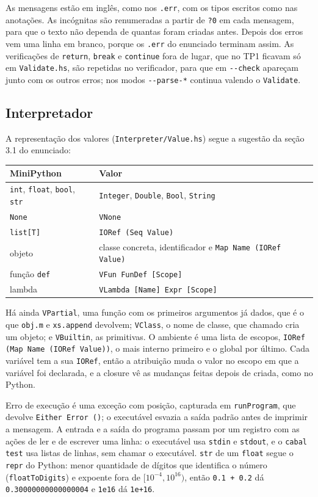 \documentclass[12pt,a4paper]{article}
\begin{document}
As mensagens estão em inglês, como nos \texttt{.err}, com os tipos
escritos como nas anotações. As incógnitas são renumeradas a partir de
\texttt{?0} em cada mensagem, para que o texto não dependa de quantas
foram criadas antes. Depois dos erros vem uma linha em branco, porque
os \texttt{.err} do enunciado terminam assim. As verificações de
\texttt{return}, \texttt{break} e \texttt{continue} fora de lugar, que
no TP1 ficavam só em \texttt{Validate.hs}, são repetidas no verificador,
para que em \texttt{-{}-check} apareçam junto com os outros erros; nos
modos \texttt{-{}-parse-*} continua valendo o \texttt{Validate}.

\subsection{Interpretador}

A representação dos valores (\texttt{Interpreter/Value.hs}) segue a
sugestão da seção 3.1 do enunciado:

\begin{center}
\begin{tabular}{ll}
\hline
MiniPython & Valor \\
\hline
\texttt{int}, \texttt{float}, \texttt{bool}, \texttt{str} & \texttt{Integer}, \texttt{Double}, \texttt{Bool}, \texttt{String} \\
\texttt{None} & \texttt{VNone} \\
\texttt{list[T]} & \texttt{IORef (Seq Value)} \\
objeto & classe concreta, identificador e \texttt{Map Name (IORef Value)} \\
função \texttt{def} & \texttt{VFun FunDef [Scope]} \\
lambda & \texttt{VLambda [Name] Expr [Scope]} \\
\hline
\end{tabular}
\end{center}

Há ainda \texttt{VPartial}, uma função com os primeiros argumentos já
dados, que é o que \texttt{obj.m} e \texttt{xs.append} devolvem;
\texttt{VClass}, o nome de classe, que chamado cria um objeto; e
\texttt{VBuiltin}, as primitivas. O ambiente é uma lista de escopos,
\texttt{IORef (Map Name (IORef Value))}, o mais interno primeiro e o
global por último. Cada variável tem a sua \texttt{IORef}, então a
atribuição muda o valor no escopo em que a variável foi declarada, e a
closure vê as mudanças feitas depois de criada, como no Python.

Erro de execução é uma exceção com posição, capturada em
\texttt{runProgram}, que devolve \texttt{Either Error ()}; o executável
esvazia a saída padrão antes de imprimir a mensagem. A entrada e a
saída do programa passam por um registro com as ações de ler e de
escrever uma linha: o executável usa \texttt{stdin} e \texttt{stdout},
e o \texttt{cabal test} usa listas de linhas, sem chamar o executável.
\texttt{str} de um \texttt{float} segue o \texttt{repr} do Python:
menor quantidade de dígitos que identifica o número
(\texttt{floatToDigits}) e expoente fora de $[10^{-4}, 10^{16})$, então
\texttt{0.1 + 0.2} dá \texttt{0.30000000000000004} e \texttt{1e16} dá
\texttt{1e+16}.
\end{document}
